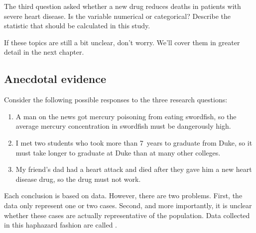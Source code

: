 \begin{exercisewrap}
\begin{nexercise}The third question asked whether a new drug reduces deaths in patients with severe heart disease. Is the variable numerical or categorical? Describe the statistic that should be calculated in this study.\footnotemark
\end{nexercise}
\end{exercisewrap}

If these topics are still a bit unclear, don't worry. We'll cover them in greater detail in the next chapter.


\D{\newpage}

\subsection{Anecdotal evidence}
\label{anecdotalEvidenceSubsection}

Consider the following possible responses to the three research questions:
\begin{enumerate}
\item A man on the news got mercury poisoning from eating swordfish, so the average mercury concentration in swordfish must be dangerously high.
\item\label{iKnowThreeStudentsWhoTookMoreThan7YearsToGraduateAtDuke} I met two students who took more than 7~years to graduate from Duke, so it must take longer to graduate at Duke than at many other colleges.
\item\label{myFriendsDadDiedAfterSulphinpyrazon} My friend's dad had a heart attack and died after they gave him a new heart disease drug, so the drug must not work.
\end{enumerate}
Each conclusion is based on data. However, there are two problems. First, the data only represent one or two cases. Second, and more importantly, it is unclear whether these cases are actually representative of the population. Data collected in this haphazard fashion are called .

